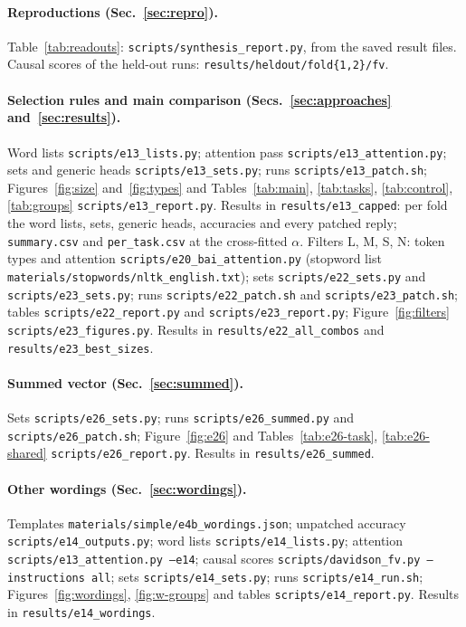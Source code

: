\documentclass[10pt,a4paper]{article}
\begin{document}
{\sloppy
\paragraph{Reproductions (Sec.~\ref{sec:repro}).} Table~\ref{tab:readouts}: \texttt{scripts/synthesis\_report.py}, from the saved result files. Causal scores of the held-out runs: \texttt{results/heldout/fold\{1,2\}/fv}.

\paragraph{Selection rules and main comparison (Secs.~\ref{sec:approaches} and~\ref{sec:results}).} Word lists \texttt{scripts/e13\_lists.py}; attention pass \texttt{scripts/e13\_attention.py}; sets and generic heads \texttt{scripts/e13\_sets.py}; runs \texttt{scripts/e13\_patch.sh}; Figures~\ref{fig:size} and~\ref{fig:types} and Tables~\ref{tab:main}, \ref{tab:tasks}, \ref{tab:control}, \ref{tab:groups} \texttt{scripts/e13\_report.py}. Results in \texttt{results/e13\_capped}: per fold the word lists, sets, generic heads, accuracies and every patched reply; \texttt{summary.csv} and \texttt{per\_task.csv} at the cross-fitted $\alpha$. Filters L, M, S, N: token types and attention \texttt{scripts/e20\_bai\_attention.py} (stopword list \texttt{materials/stopwords/nltk\_english.txt}); sets \texttt{scripts/e22\_sets.py} and \texttt{scripts/e23\_sets.py}; runs \texttt{scripts/e22\_patch.sh} and \texttt{scripts/e23\_patch.sh}; tables \texttt{scripts/e22\_report.py} and \texttt{scripts/e23\_report.py}; Figure~\ref{fig:filters} \texttt{scripts/e23\_figures.py}. Results in \texttt{results/e22\_all\_combos} and \texttt{results/e23\_best\_sizes}.

\paragraph{Summed vector (Sec.~\ref{sec:summed}).} Sets \texttt{scripts/e26\_sets.py}; runs \texttt{scripts/e26\_summed.py} and \texttt{scripts/e26\_patch.sh}; Figure~\ref{fig:e26} and Tables~\ref{tab:e26-task}, \ref{tab:e26-shared} \texttt{scripts/e26\_report.py}. Results in \texttt{results/e26\_summed}.

\paragraph{Other wordings (Sec.~\ref{sec:wordings}).} Templates \texttt{materials/simple/e4b\_wordings.json}; unpatched accuracy \texttt{scripts/e14\_outputs.py}; word lists \texttt{scripts/e14\_lists.py}; attention \texttt{scripts/e13\_attention.py --e14}; causal scores \texttt{scripts/davidson\_fv.py --instructions all}; sets \texttt{scripts/e14\_sets.py}; runs \texttt{scripts/e14\_run.sh}; Figures~\ref{fig:wordings}, \ref{fig:w-groups} and tables \texttt{scripts/e14\_report.py}. Results in \texttt{results/e14\_wordings}.

}
\end{document}
